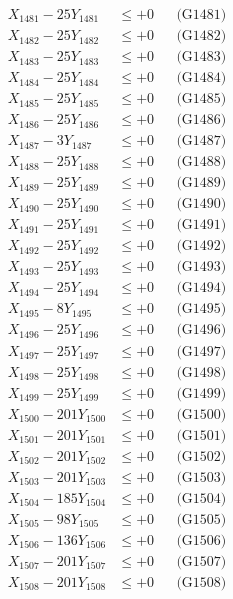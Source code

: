 \documentclass[a4paper,10pt]{article}
\begin{document}
{\begin{align}
\allowbreak
X_{1481} - 25Y_{1481} &\leq +0 && \text{(G1481)} \\
X_{1482} - 25Y_{1482} &\leq +0 && \text{(G1482)} \\
X_{1483} - 25Y_{1483} &\leq +0 && \text{(G1483)} \\
X_{1484} - 25Y_{1484} &\leq +0 && \text{(G1484)} \\
X_{1485} - 25Y_{1485} &\leq +0 && \text{(G1485)} \\
X_{1486} - 25Y_{1486} &\leq +0 && \text{(G1486)} \\
X_{1487} - 3Y_{1487} &\leq +0 && \text{(G1487)} \\
X_{1488} - 25Y_{1488} &\leq +0 && \text{(G1488)} \\
X_{1489} - 25Y_{1489} &\leq +0 && \text{(G1489)} \\
X_{1490} - 25Y_{1490} &\leq +0 && \text{(G1490)} \\
\allowbreak
X_{1491} - 25Y_{1491} &\leq +0 && \text{(G1491)} \\
X_{1492} - 25Y_{1492} &\leq +0 && \text{(G1492)} \\
X_{1493} - 25Y_{1493} &\leq +0 && \text{(G1493)} \\
X_{1494} - 25Y_{1494} &\leq +0 && \text{(G1494)} \\
X_{1495} - 8Y_{1495} &\leq +0 && \text{(G1495)} \\
X_{1496} - 25Y_{1496} &\leq +0 && \text{(G1496)} \\
X_{1497} - 25Y_{1497} &\leq +0 && \text{(G1497)} \\
X_{1498} - 25Y_{1498} &\leq +0 && \text{(G1498)} \\
X_{1499} - 25Y_{1499} &\leq +0 && \text{(G1499)} \\
X_{1500} - 201Y_{1500} &\leq +0 && \text{(G1500)} \\
\allowbreak
X_{1501} - 201Y_{1501} &\leq +0 && \text{(G1501)} \\
X_{1502} - 201Y_{1502} &\leq +0 && \text{(G1502)} \\
X_{1503} - 201Y_{1503} &\leq +0 && \text{(G1503)} \\
X_{1504} - 185Y_{1504} &\leq +0 && \text{(G1504)} \\
X_{1505} - 98Y_{1505} &\leq +0 && \text{(G1505)} \\
X_{1506} - 136Y_{1506} &\leq +0 && \text{(G1506)} \\
X_{1507} - 201Y_{1507} &\leq +0 && \text{(G1507)} \\
X_{1508} - 201Y_{1508} &\leq +0 && \text{(G1508)} \\

\end{align}}
\end{document}
